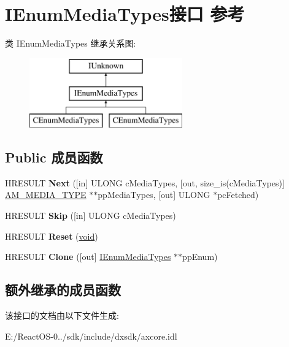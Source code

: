 \hypertarget{interface_i_enum_media_types}{}\section{I\+Enum\+Media\+Types接口 参考}
\label{interface_i_enum_media_types}
类 I\+Enum\+Media\+Types 继承关系图\+:\begin{figure}[H]
\begin{center}
\leavevmode
\includegraphics[height=3.000000cm]{interface_i_enum_media_types}
\end{center}
\end{figure}
\subsection*{Public 成员函数}
\begin{DoxyCompactItemize}
\item 
\mbox{\label{interface_i_enum_media_types_a31add87fa94278399361bc3cc8389acb}} 
H\+R\+E\+S\+U\+LT {\bfseries Next} (\mbox{[}in\mbox{]} U\+L\+O\+NG c\+Media\+Types, \mbox{[}out, size\+\_\+is(c\+Media\+Types)\mbox{]} \hyperlink{struct_a_m___m_e_d_i_a___t_y_p_e}{A\+M\+\_\+\+M\+E\+D\+I\+A\+\_\+\+T\+Y\+PE} $\ast$$\ast$pp\+Media\+Types, \mbox{[}out\mbox{]} U\+L\+O\+NG $\ast$pc\+Fetched)
\item 
\mbox{\label{interface_i_enum_media_types_a4191de86f4f3b4805c7ce2526abdbaa6}} 
H\+R\+E\+S\+U\+LT {\bfseries Skip} (\mbox{[}in\mbox{]} U\+L\+O\+NG c\+Media\+Types)
\item 
\mbox{\label{interface_i_enum_media_types_a9a5ad80ee76853e31bcf7729adb164d0}} 
H\+R\+E\+S\+U\+LT {\bfseries Reset} (\hyperlink{interfacevoid}{void})
\item 
\mbox{\label{interface_i_enum_media_types_a0e4ee350a02d04abd025c8460f4961f7}} 
H\+R\+E\+S\+U\+LT {\bfseries Clone} (\mbox{[}out\mbox{]} \hyperlink{interface_i_enum_media_types}{I\+Enum\+Media\+Types} $\ast$$\ast$pp\+Enum)
\end{DoxyCompactItemize}
\subsection*{额外继承的成员函数}


该接口的文档由以下文件生成\+:\begin{DoxyCompactItemize}
\item 
E\+:/\+React\+O\+S-\/0../sdk/include/dxsdk/axcore.\+idl\end{DoxyCompactItemize}
